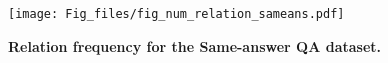 \begin{figure}[t]
 \centering
  \texttt{[image: Fig\_files/fig\_num\_relation\_sameans.pdf]}
  \caption{\textbf{Relation frequency for the Same-answer QA dataset.}}
  \label{num_relation_sameans}
\end{figure}
